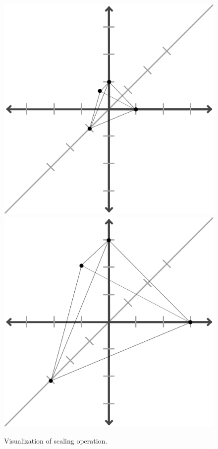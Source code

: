 \documentclass{article}
\begin{document}
	\begin{figure}[H]
		\centering
		\includegraphics{img/scaling_before-rotation_before.png}
		\includegraphics{img/scaling_after.png}
		\caption{Visualization of scaling operation.}
	\end{figure}
\end{document}
